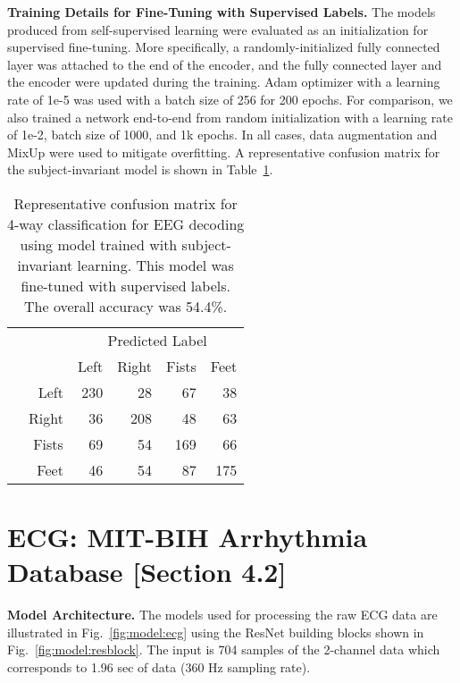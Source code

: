 \documentclass{article}
\renewcommand{\paragraph}[1]{\textbf{#1}\hspace{1em}}
\begin{document}
\paragraph{Training Details for Fine-Tuning with Supervised Labels.}
The models produced from self-supervised learning were evaluated as an
initialization for supervised fine-tuning. More specifically, a
randomly-initialized fully connected layer was attached to the end of the
encoder, and the fully connected layer and the encoder were updated during the
training. Adam optimizer with a learning rate of 1e-5 was used with a batch size
of 256 for 200 epochs. For comparison, we also trained a network end-to-end from
random initialization with a learning rate of 1e-2, batch size of 1000, and 1k
epochs. In all cases, data augmentation and MixUp \cite{zhang_mixup_2018} were
used to mitigate overfitting. A representative confusion matrix for the
subject-invariant model is shown in Table~\ref{table:eeg:confusion}.

\begin{table}[H]
  \caption{Representative confusion matrix for 4-way classification for EEG
  decoding using model trained with subject-invariant learning. This model was
  fine-tuned with supervised labels. The overall accuracy was 54.4\%.}
  \label{table:eeg:confusion}
  \centering
  \begin{tabular}{rr|rrrr}
    \toprule
& & \multicolumn{4}{c}{Predicted Label} \\
    & & Left & Right & Fists & Feet \\
    \hline
    \parbox[t]{2mm}{}
    &  Left & 230 &  28 &  67 &  38 \\
    & Right &  36 & 208 &  48 &  63 \\
    & Fists &  69 &  54 & 169 &  66 \\
    &  Feet &  46 &  54 &  87 & 175 \\
    \bottomrule
  \end{tabular}
\end{table} \clearpage
\section{ECG: MIT-BIH Arrhythmia Database [Section 4.2]}

\paragraph{Model Architecture.} The models used for processing the raw ECG data
are illustrated in Fig.~\ref{fig:model:ecg} using the ResNet building blocks
shown in Fig.~\ref{fig:model:resblock}. The input is 704 samples of the
2-channel data which corresponds to 1.96 sec of data (360 Hz sampling
rate).
\end{document}
